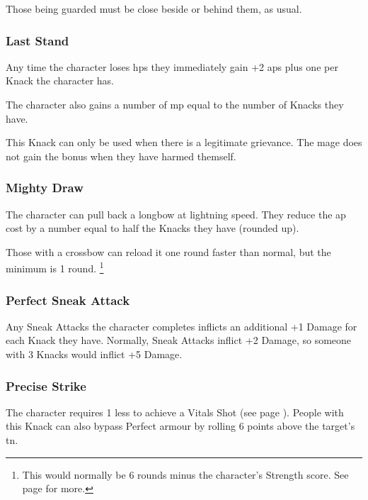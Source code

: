 \begin{multicols}{2}
Those being guarded must be close beside or behind them, as usual.

\subsubsection{Last Stand}

Any time the character loses \glspl{hp} they immediately gain +2 \glspl{ap} plus one per Knack the character has.

The character also gains a number of \gls{mp} equal to the number of Knacks they have.

This Knack can only be used when there is a legitimate grievance.
The mage does not gain the bonus when they have harmed themself.

\subsubsection{Mighty Draw}

The character can pull back a longbow at lightning speed.
They reduce the \gls{ap} cost by a number equal to half the Knacks they have (rounded up).

Those with a crossbow can reload it one round faster than normal, but the minimum is 1 round.%
\footnote{This would normally be 6 rounds minus the character's Strength score. See page \pageref{crossbow} for more.}

\subsubsection{Perfect Sneak Attack}

Any Sneak Attacks the character completes inflicts an additional +1 Damage for each Knack they have.
Normally, Sneak Attacks inflict +2 Damage, so someone with 3 Knacks would inflict +5 Damage.

\subsubsection{Precise Strike}\label{precisestrike}

The character requires 1 less to achieve a Vitals Shot (see page \pageref{vitals}).
\iftoggle{verbose}{
  For example, when targeting an opponent with an Attack score of +2 and Partial armour, someone would normally require a score of 9 to hit and a score of 12 to make a Vitals Shot which ignores all armour.
  With this Knack they still require a score of 9 to hit but only a score of 11 to make a Vitals Shot.
}{}
People with this Knack can also bypass Perfect armour by rolling 6 points above the target's \gls{tn}.


\end{multicols}
